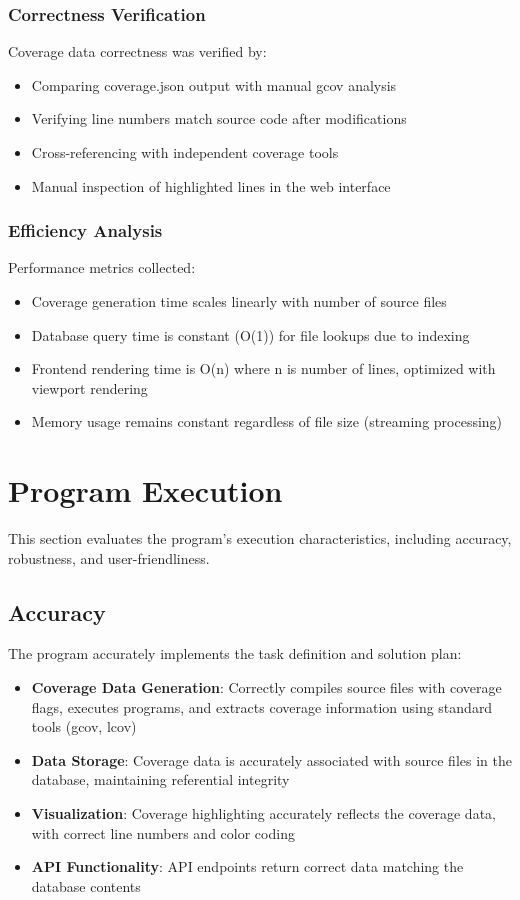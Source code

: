 \subsubsection{Correctness Verification}

Coverage data correctness was verified by:
\begin{itemize}
    \item Comparing coverage.json output with manual gcov analysis
    \item Verifying line numbers match source code after modifications
    \item Cross-referencing with independent coverage tools
    \item Manual inspection of highlighted lines in the web interface
\end{itemize}

\subsubsection{Efficiency Analysis}

Performance metrics collected:
\begin{itemize}
    \item Coverage generation time scales linearly with number of source files
    \item Database query time is constant (O(1)) for file lookups due to indexing
    \item Frontend rendering time is O(n) where n is number of lines, optimized with viewport rendering
    \item Memory usage remains constant regardless of file size (streaming processing)
\end{itemize}

\section{Program Execution}

This section evaluates the program's execution characteristics, including accuracy, robustness, and user-friendliness.

\subsection{Accuracy}

The program accurately implements the task definition and solution plan:

\begin{itemize}
    \item \textbf{Coverage Data Generation}: Correctly compiles source files with coverage flags, executes programs, and extracts coverage information using standard tools (gcov, lcov)
    \item \textbf{Data Storage}: Coverage data is accurately associated with source files in the database, maintaining referential integrity
    \item \textbf{Visualization}: Coverage highlighting accurately reflects the coverage data, with correct line numbers and color coding
    \item \textbf{API Functionality}: API endpoints return correct data matching the database contents
\end{itemize}

